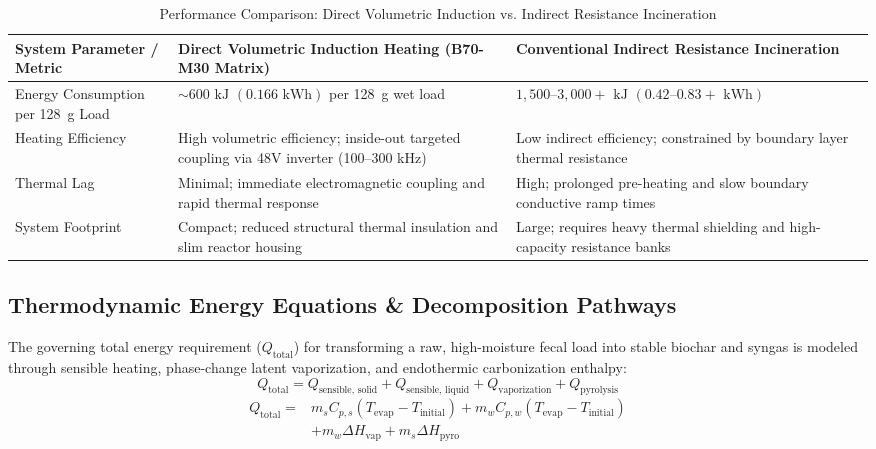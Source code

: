\documentclass[10pt,twocolumn,a4paper]{article}
\begin{document}
\begin{table}[t]
\centering
\caption{Performance Comparison: Direct Volumetric Induction vs. Indirect Resistance Incineration}
\label{tab:heating_comparison}
\begin{tabular}{p{4.5cm} p{5.5cm} p{5.5cm}}
\toprule
\textbf{System Parameter / Metric} & \textbf{Direct Volumetric Induction Heating (B70-M30 Matrix)} & \textbf{Conventional Indirect Resistance Incineration} \\
\midrule
Energy Consumption per 128~g Load & $\sim 600\text{ kJ } (0.166\text{ kWh})$ per 128~g wet load & $1,500\text{--}3,000+\text{ kJ } (0.42\text{--}0.83+\text{ kWh})$ \\
Heating Efficiency & High volumetric efficiency; inside-out targeted coupling via 48V inverter (100–300 kHz) & Low indirect efficiency; constrained by boundary layer thermal resistance \\
Thermal Lag & Minimal; immediate electromagnetic coupling and rapid thermal response & High; prolonged pre-heating and slow boundary conductive ramp times \\
System Footprint & Compact; reduced structural thermal insulation and slim reactor housing & Large; requires heavy thermal shielding and high-capacity resistance banks \\
\bottomrule
\end{tabular}
\end{table}

\subsection{Thermodynamic Energy Equations \& Decomposition Pathways}

The governing total energy requirement ($Q_{\text{total}}$) for transforming a raw, high-moisture fecal load into stable biochar and syngas is modeled through sensible heating, phase-change latent vaporization, and endothermic carbonization enthalpy:
\begin{equation}
Q_{\text{total}} = Q_{\text{sensible, solid}} + Q_{\text{sensible, liquid}} + Q_{\text{vaporization}} + Q_{\text{pyrolysis}}
\end{equation}
\begin{equation}
\begin{aligned}
Q_{\text{total}} = {} & m_s C_{p,s} (T_{\text{evap}} - T_{\text{initial}}) + m_w C_{p,w} (T_{\text{evap}} - T_{\text{initial}}) \\
& + m_w \Delta H_{\text{vap}} + m_s \Delta H_{\text{pyro}}
\end{aligned}
\end{equation}
\end{document}
